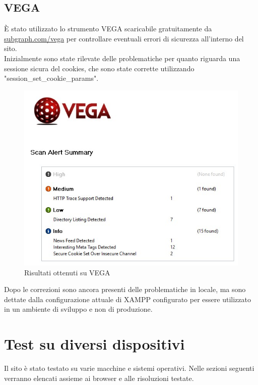\documentclass[openany, a4paper, 12pt]{report}
\begin{document}
			\subsection{VEGA}
			\`{E} stato utilizzato lo strumento VEGA scaricabile gratuitamente da \url{subgraph.com/vega} per controllare eventuali errori di sicurezza all'interno del sito.\\
			Inizialmente sono state rilevate delle problematiche per quanto riguarda una sessione sicura del cookies, che sono state corrette utilizzando "session\_set\_cookie\_params".
			
			\begin{figure}[H]
				\centering
				\includegraphics[width=0.8\linewidth]{images/VEGA}
				\caption{Risultati ottenuti su VEGA}
			\end{figure}
			Dopo le correzioni sono ancora presenti delle problematiche in locale, ma sono dettate dalla configurazione attuale di XAMPP configurato per essere utilizzato in un ambiente di sviluppo e non di produzione.

		\section{Test su diversi dispositivi}
			Il sito è stato testato su varie macchine e sistemi operativi. Nelle sezioni seguenti verranno elencati assieme ai browser e alle risoluzioni testate.
\end{document}

